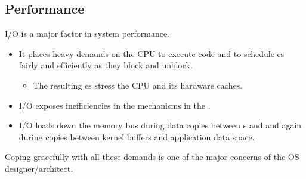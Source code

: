 \subsection{Performance}\label{subsec:IO_Subsystem_Performance}
I/O is a major factor in system performance.
\begin{itemize}[noitemsep]
\item It places heavy demands on the CPU to execute  code and to schedule es fairly and efficiently as they block and unblock.
  \begin{itemize}[noitemsep]
  \item The resulting es stress the CPU and its hardware caches.
\end{itemize}
\item I/O exposes inefficiencies in the  mechanisms in the .
\item I/O loads down the memory bus during data copies between s and  and again during copies between kernel buffers and application data space.
\end{itemize}

Coping gracefully with all these demands is one of the major concerns of the OS designer/architect.


